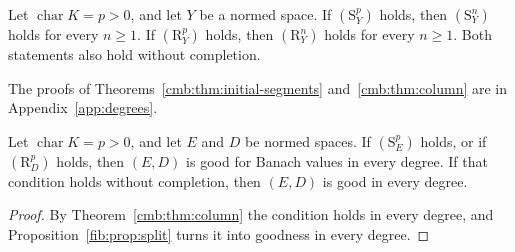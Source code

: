 \begin{theorem}\label{cmb:thm:column}
Let $\operatorname{char}K=p>0$, and let $Y$ be a normed space. If $(\mathrm S^p_Y)$ holds, then $(\mathrm S^n_Y)$ holds for
every $n\ge1$. If $(\mathrm R^p_Y)$ holds, then $(\mathrm R^n_Y)$ holds for every $n\ge1$. Both statements also hold
without completion.
\end{theorem}

The proofs of Theorems~\ref{cmb:thm:initial-segments} and~\ref{cmb:thm:column} are in Appendix~\ref{app:degrees}.

\begin{corollary}\label{cmb:cor:column}
Let $\operatorname{char}K=p>0$, and let $E$ and $D$ be normed spaces. If $(\mathrm S^p_E)$ holds, or if
$(\mathrm R^p_D)$ holds, then $(E,D)$ is good for Banach values in every degree. If that condition holds without
completion, then $(E,D)$ is good in every degree.
\end{corollary}

\begin{proof}
By Theorem~\ref{cmb:thm:column} the condition holds in every degree, and Proposition~\ref{fib:prop:split} turns it into
goodness in every degree.
\end{proof}

